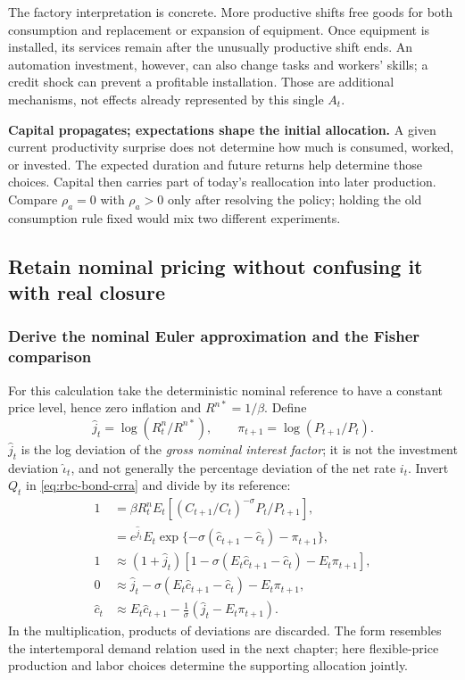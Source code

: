 The factory interpretation is concrete. More productive shifts free goods for
both consumption and replacement or expansion of equipment. Once equipment is
installed, its services remain after the unusually productive shift ends.
An automation investment, however, can also change tasks and workers' skills;
a credit shock can prevent a profitable installation. Those are additional
mechanisms, not effects already represented by this single $A_t$.

\begin{greenblock}
\textbf{Capital propagates; expectations shape the initial allocation.}
A given current productivity surprise does not determine how much is consumed,
worked, or invested. The expected duration and future returns help determine
those choices. Capital then carries part of today's reallocation into later
production. Compare $\rho_a=0$ with $\rho_a>0$ only after resolving the policy;
holding the old consumption rule fixed would mix two different experiments.
\end{greenblock}

\subsection{Retain nominal pricing without confusing it with real closure}\label{sec:rbc-nominal}

\subsubsection{Derive the nominal Euler approximation and the Fisher comparison}

For this calculation take the deterministic nominal reference to have a
constant price level, hence zero inflation and $R^{n*}=1/\beta$. Define
\[
\hat j_t=\log(R_t^n/R^{n*}),\qquad
\pi_{t+1}=\log(P_{t+1}/P_t).
\]
$\hat j_t$ is the log deviation of the \emph{gross nominal interest factor};
it is not the investment deviation $\hat\iota_t$, and not generally the
percentage deviation of the net rate $i_t$. Invert $Q_t$ in
\eqref{eq:rbc-bond-crra} and divide by its reference:
\begin{align}
1&=\beta R_t^n E_t\!\left[
 (C_{t+1}/C_t)^{-\sigma}P_t/P_{t+1}\right],\\
&=e^{\hat j_t}E_t\exp\{-\sigma(\hat c_{t+1}-\hat c_t)-\pi_{t+1}\},\\
1&\approx(1+\hat j_t)
 [1-\sigma(E_t\hat c_{t+1}-\hat c_t)-E_t\pi_{t+1}],\\
0&\approx\hat j_t-\sigma(E_t\hat c_{t+1}-\hat c_t)-E_t\pi_{t+1},\\
\hat c_t&\approx E_t\hat c_{t+1}
 -\frac{1}{\sigma}(\hat j_t-E_t\pi_{t+1}).\label{eq:rbc-nominal-linear}
\end{align}
In the multiplication, products of deviations are discarded. The form resembles
the intertemporal demand relation used in the next chapter; here flexible-price
production and labor choices determine the supporting allocation jointly.

